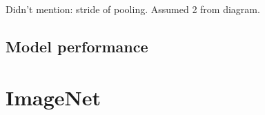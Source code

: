 \documentclass[honours,12pt]{unswthesis}
\numberwithin{equation}{section}
\begin{document}
Didn't mention: stride of pooling. Assumed 2 from diagram.
 
\subsection{Model performance}
 
\section{ImageNet}



\clearpage




\end{document}
